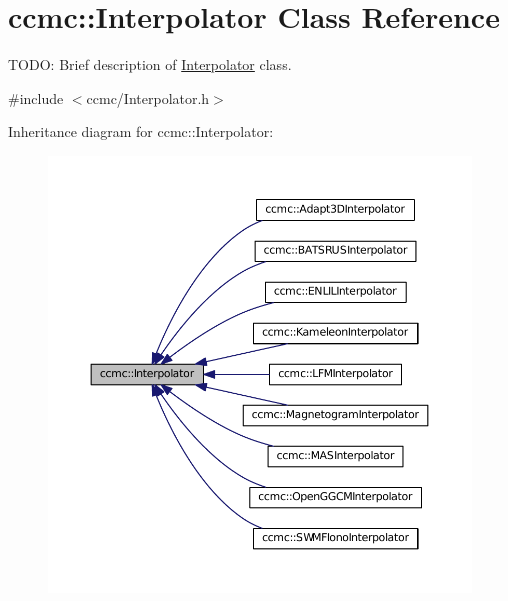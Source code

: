 \hypertarget{classccmc_1_1_interpolator}{\section{ccmc\-:\-:Interpolator Class Reference}
\label{classccmc_1_1_interpolator}
}


T\-O\-D\-O\-: Brief description of \hyperlink{classccmc_1_1_interpolator}{Interpolator} class.  




{\ttfamily \#include $<$ccmc/\-Interpolator.\-h$>$}



Inheritance diagram for ccmc\-:\-:Interpolator\-:
\nopagebreak
\begin{figure}[H]
\begin{center}
\leavevmode
\includegraphics[width=350pt]{classccmc_1_1_interpolator__inherit__graph}
\end{center}
\end{figure}


